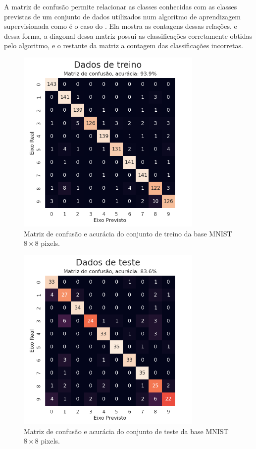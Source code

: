 A matriz de confusão permite relacionar as classes conhecidas com as classes previstas de um conjunto de dados utilizados num algoritmo de aprendizagem supervisionada como é o caso do . Ela mostra as contagens dessas relações, e dessa forma, a diagonal dessa matriz possui as classificações corretamente obtidas pelo algoritmo, e o restante da matriz a contagem das classificações incorretas.

\begin{figure}[htb]
\centering
\includegraphics[width=9cm]{figuras/mnist_treino}
\caption{Matriz de confusão e acurácia do conjunto de treino da base MNIST ${8\times8}$ pixels.}
\label{fig:mnist_treino}
\end{figure}

\begin{figure}[htb]
\centering
\includegraphics[width=9cm]{figuras/mnist_test}
\caption{Matriz de confusão e acurácia do conjunto de teste da base MNIST ${8\times8}$ pixels.}
\label{fig:mnist_test}
\end{figure}

